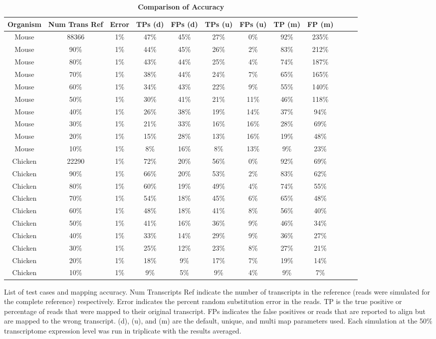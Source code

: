 \documentclass[10pt]{article}
\begin{document}
\begin{table}[!ht]
\caption{
\bf{Comparison of Accuracy}}
\begin{tabular}{|c|c|c||c|c||c|c||c|c||c|c||c|}
\hline
Organism & Num Trans Ref & Error & TPs (d) & FPs (d) & TPs (u) & FPs (u) & TP (m) & FP (m)\\
\hline
Mouse & 88366 & 1\% & 47\%&45\%& 27\%&0\%&92\%&235\%\\
Mouse & 90\% & 1\% & 44\%&45\%& 26\%&2\%&83\%&212\%\\
Mouse & 80\% & 1\% & 43\%&44\%& 25\%&4\%&74\%&187\%\\
Mouse & 70\% & 1\% & 38\%&44\%& 24\%&7\%&65\%&165\%\\
Mouse & 60\% & 1\% & 34\%&43\%& 22\%&9\%&55\%&140\%\\
Mouse & 50\% & 1\% & 30\%&41\%& 21\%&11\%&46\%&118\%\\
Mouse & 40\% & 1\% & 26\%&38\%& 19\%&14\%&37\%&94\%\\
Mouse & 30\% & 1\% & 21\%&33\%& 16\%&16\%&28\%&69\%\\
Mouse & 20\% & 1\% & 15\%&28\%& 13\%&16\%&19\%&48\%\\
Mouse & 10\% & 1\% &   8\%&16\%&   8\%&13\%&  9\%&23\%\\
\hline
Chicken & 22290 & 1\% & 72\%&20\%& 56\%&0\%&92\%&69\%\\
Chicken & 90\% & 1\% & 66\%&20\%& 53\%&2\%&83\%&62\%\\
Chicken & 80\% & 1\% & 60\%&19\%& 49\%&4\%&74\%&55\%\\
Chicken & 70\% & 1\% & 54\%&18\%& 45\%&6\%&65\%&48\%\\
Chicken & 60\% & 1\% & 48\%&18\%& 41\%&8\%&56\%&40\%\\
Chicken & 50\% & 1\% & 41\%&16\%& 36\%&9\%&46\%&34\%\\
Chicken & 40\% & 1\% & 33\%&14\%& 29\%&9\%&36\%&27\%\\
Chicken & 30\% & 1\% & 25\%&12\%& 23\%&8\%&27\%&21\%\\
Chicken & 20\% & 1\% & 18\%& 9\%& 17\%& 7\%&19\%&14\%\\
Chicken & 10\% & 1\% & 9\%&   5\%&    9\%& 4\%& 9\%&  7\%\\
\hline
\end{tabular}
\begin{flushleft} List of test cases and mapping accuracy.  Num Transcripts Ref  indicate the number of transcripts in the reference (reads were simulated for the complete reference) respectively.  Error indicates the percent random substitution error in the reads. TP is the true positive or percentage of reads that were mapped to their original transcript.  FPs indicates the false positives or reads that are reported to align but are mapped to the wrong transcript. (d), (u), and (m) are the default, unique, and multi map parameters used.  Each simulation at the 50\% transcriptome expression level was run in triplicate with the results averaged.
\end{flushleft}
\label{tab:accuracy}
\end{table}
\end{document}
